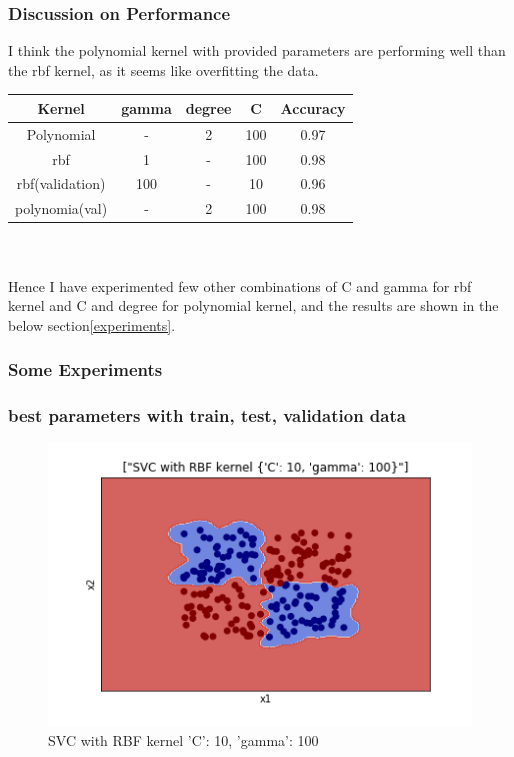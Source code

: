 \documentclass[10pt,a4paper]{article}
\begin{document}
\subsubsection{Discussion on Performance}
I think the polynomial kernel with provided parameters are performing well than the rbf kernel, as it seems like overfitting the data. 
\\

\begin{tabular}{|c|c|c|c|c|}
\hline 
Kernel & gamma & degree & C & Accuracy\\ 
\hline 
Polynomial & - & 2 & 100 & 0.97\\ 
\hline 
rbf & 1 & - & 100 & 0.98\\ 
\hline 
rbf(validation) & 100 & - & 10 & 0.96\\ 
\hline 
polynomia(val) & - & 2 & 100 & 0.98\\ 
\hline 
\end{tabular} \label{tab1}\\
\\
Hence I have experimented few other combinations of C and gamma for rbf kernel and C and degree for polynomial kernel, and the results are shown in the below section\ref{experiments}.
\clearpage
\subsubsection*{Some Experiments}\label{experiments}
\subsubsection*{best parameters with train, test, validation data}

\graphicspath{ {/images/} }
\begin{figure}[!h]
\includegraphics[scale=0.75]{images/P2/RBFg100c10.png}
  \caption{SVC with RBF kernel {'C': 10, 'gamma': 100}}
  \label{fig:rbf_kerE1}
\end{figure}
\vfill
\clearpage
\end{document}

